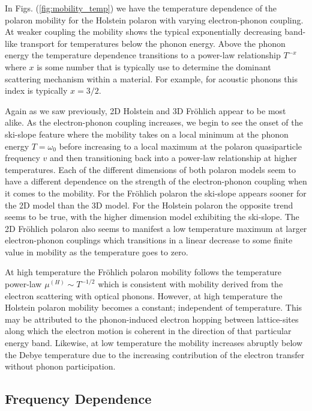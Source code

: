 In Figs. (\ref{fig:mobility_temp}) we have the temperature dependence of the polaron mobility for the Holstein polaron with varying electron-phonon coupling. At weaker coupling the mobility shows the typical exponentially decreasing band-like transport for temperatures below the phonon energy. Above the phonon energy the temperature dependence transitions to a power-law relationship $T^{-x}$ where $x$ is some number that is typically use to determine the dominant scattering mechanism within a material. For example, for acoustic phonons this index is typically $x = 3/2$. 
\newline

Again as we saw previously, 2D Holstein and 3D Fr\"ohlich appear to be most alike. As the electron-phonon coupling increases, we begin to see the onset of the ski-slope feature where the mobility takes on a local minimum at the phonon energy $T = \omega_0$ before increasing to a local maximum at the polaron quasiparticle frequency $v$ and then transitioning back into a power-law relationship at higher temperatures. Each of the different dimensions of both polaron models seem to have a different dependence on the strength of the electron-phonon coupling when it comes to the mobility. For the Fr\"ohlich polaron the ski-slope appears sooner for the 2D model than the 3D model. For the Holstein polaron the opposite trend seems to be true, with the higher dimension model exhibiting the ski-slope. The 2D Fr\"ohlich polaron also seems to manifest a low temperature maximum at larger electron-phonon couplings which transitions in a linear decrease to some finite value in mobility as the temperature goes to zero.
\newline

At high temperature the Fr\"ohlich polaron mobility follows the temperature power-law $\mu^{(H)} \sim T^{-1/2}$ which is consistent with mobility derived from the electron scattering with optical phonons. However, at high temperature the Holstein polaron mobility becomes a constant; independent of temperature. This may be attributed to the phonon-induced electron hopping between lattice-sites along which the electron motion is coherent in the direction of that particular energy band. Likewise, at low temperature the mobility increases abruptly below the Debye temperature due to the increasing contribution of the electron transfer without phonon participation.

\subsection{Frequency Dependence}

